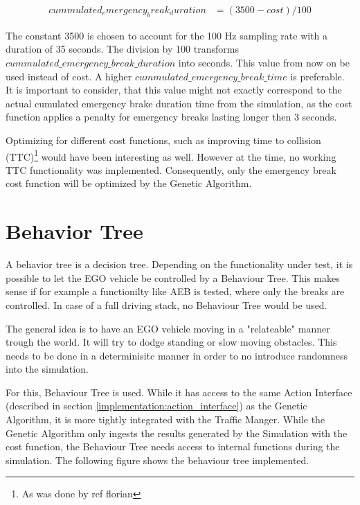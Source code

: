 \begin{equation} 
	\label{equ:modified_cost}
	\begin{split}
		cummulated_emergency_break_duration & = (3500 - cost) / 100
	\end{split}
\end{equation}

The constant 3500 is chosen to account for the 100 Hz sampling rate with a duration of 35 seconds. The division by 100 transforms $cummulated\_emergency\_break\_duration$ into seconds. This value from now on be used instead of cost. A higher $cummulated\_emergency\_break\_time$ is preferable. It is important to consider, that this value might not exactly correspond to the actual cumulated emergency brake duration time from the simulation, as the cost function applies a penalty for emergency breaks lasting longer then 3 seconds.

Optimizing for different cost functions, such as improving time to collision (TTC)\footnote{As was done by ref florian} would have been interesting as well. However at the time, no working TTC functionality was implemented. Consequently, only the emergency break cost function will be optimized by the Genetic Algorithm.

\section{Behavior Tree}
A behavior tree is a decision tree. 
Depending on the functionality under test, it is possible to let the EGO vehicle be controlled by a Behaviour Tree. This makes sense if for example a functionilty like AEB is tested, where only the breaks are controlled. In case of a full driving stack, no Behaviour Tree would be used.

The general idea is to have an EGO vehicle moving in a "relateable" manner trough the world. It will try to dodge standing or slow moving obstacles. This needs to be done in a determinisitc manner in order to no introduce randomness into the simulation.

For this, Behaviour Tree is used. While it has access to the same Action Interface (described in section \ref{implementation:action_interface}) as the Genetic Algorithm, it is more tightly integrated with the Traffic Manger. While the Genetic Algorithm only ingests the results generated by the Simulation with the cost function, the Behaviour Tree needs access to internal functions during the simulation. The following figure shows the behaviour tree implemented.




